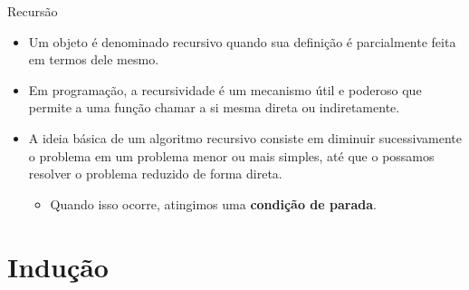 \documentclass[handout]{beamer}
\begin{document}
\begin{frame}{Recursão}

    \begin{itemize}[<+->]
        \item Um objeto é denominado recursivo quando sua definição é parcialmente feita em termos dele mesmo.
        \item Em programação, a recursividade é um mecanismo útil e poderoso que permite a uma função chamar a si mesma direta ou indiretamente.
        \item A ideia básica de um algoritmo recursivo consiste em diminuir sucessivamente o problema em um problema menor ou mais simples, até que o possamos resolver o problema reduzido de forma direta.
        \begin{itemize}
            \item Quando isso ocorre, atingimos uma \textbf{condição de parada}.
        \end{itemize}
    \end{itemize}
\end{frame}


\section{Indução}
\end{document}
